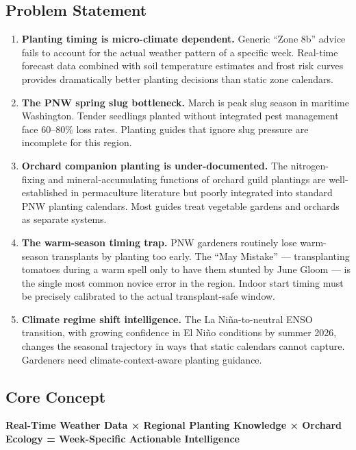 \documentclass[11pt,letterpaper]{article}
\begin{document}
\subsection{Problem Statement}

\begin{enumerate}[leftmargin=*]
\item \textbf{Planting timing is micro-climate dependent.} Generic ``Zone 8b'' advice fails to account for the actual weather pattern of a specific week. Real-time forecast data combined with soil temperature estimates and frost risk curves provides dramatically better planting decisions than static zone calendars.

\item \textbf{The PNW spring slug bottleneck.} March is peak slug season in maritime Washington. Tender seedlings planted without integrated pest management face 60--80\% loss rates. Planting guides that ignore slug pressure are incomplete for this region.

\item \textbf{Orchard companion planting is under-documented.} The nitrogen-fixing and mineral-accumulating functions of orchard guild plantings are well-established in permaculture literature but poorly integrated into standard PNW planting calendars. Most guides treat vegetable gardens and orchards as separate systems.

\item \textbf{The warm-season timing trap.} PNW gardeners routinely lose warm-season transplants by planting too early. The ``May Mistake'' --- transplanting tomatoes during a warm spell only to have them stunted by June Gloom --- is the single most common novice error in the region. Indoor start timing must be precisely calibrated to the actual transplant-safe window.

\item \textbf{Climate regime shift intelligence.} The La Niña-to-neutral ENSO transition, with growing confidence in El Niño conditions by summer 2026, changes the seasonal trajectory in ways that static calendars cannot capture. Gardeners need climate-context-aware planting guidance.
\end{enumerate}

\subsection{Core Concept}

\begin{center}
\textbf{\sffamily\textcolor{primary}{Real-Time Weather Data × Regional Planting Knowledge × Orchard Ecology = Week-Specific Actionable Intelligence}}
\end{center}
\end{document}
